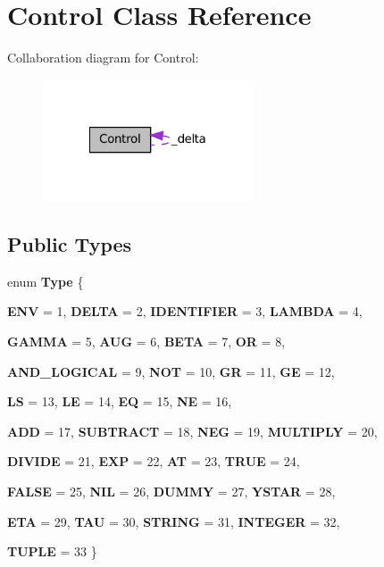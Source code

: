\hypertarget{classControl}{
\section{Control Class Reference}
\label{classControl}
}


Collaboration diagram for Control:\nopagebreak
\begin{figure}[H]
\begin{center}
\leavevmode
\includegraphics[width=178pt]{classControl__coll__graph}
\end{center}
\end{figure}
\subsection*{Public Types}
\begin{DoxyCompactItemize}
\item 
enum {\bfseries Type} \{ \par
{\bfseries ENV} =  1, 
{\bfseries DELTA} =  2, 
{\bfseries IDENTIFIER} =  3, 
{\bfseries LAMBDA} =  4, 
\par
{\bfseries GAMMA} =  5, 
{\bfseries AUG} =  6, 
{\bfseries BETA} =  7, 
{\bfseries OR} =  8, 
\par
{\bfseries AND\_\-LOGICAL} =  9, 
{\bfseries NOT} =  10, 
{\bfseries GR} =  11, 
{\bfseries GE} =  12, 
\par
{\bfseries LS} =  13, 
{\bfseries LE} =  14, 
{\bfseries EQ} =  15, 
{\bfseries NE} =  16, 
\par
{\bfseries ADD} =  17, 
{\bfseries SUBTRACT} =  18, 
{\bfseries NEG} =  19, 
{\bfseries MULTIPLY} =  20, 
\par
{\bfseries DIVIDE} =  21, 
{\bfseries EXP} =  22, 
{\bfseries AT} =  23, 
{\bfseries TRUE} =  24, 
\par
{\bfseries FALSE} =  25, 
{\bfseries NIL} =  26, 
{\bfseries DUMMY} =  27, 
{\bfseries YSTAR} =  28, 
\par
{\bfseries ETA} =  29, 
{\bfseries TAU} =  30, 
{\bfseries STRING} =  31, 
{\bfseries INTEGER} =  32, 
\par
{\bfseries TUPLE} =  33
 \}
\end{DoxyCompactItemize}
